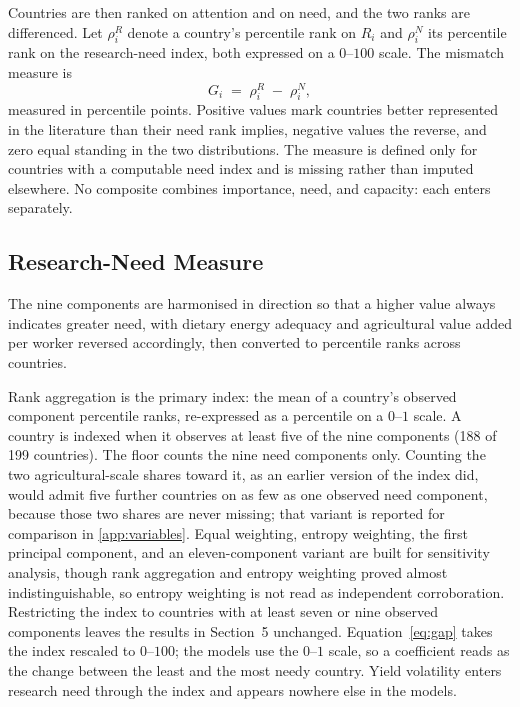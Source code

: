 \documentclass[ASNA,twocolumn]{USG}
\begin{document}
Countries are then ranked on attention and on need, and the two ranks are differenced. Let
$\rho^{R}_{i}$ denote a country's percentile rank on $R_{i}$ and $\rho^{N}_{i}$ its percentile
rank on the research-need index, both expressed on a $0$--$100$ scale. The mismatch measure is
\begin{equation}
G_{i} \;=\; \rho^{R}_{i} \;-\; \rho^{N}_{i},
\label{eq:gap}
\end{equation}
measured in percentile points. Positive values mark countries better represented in the
literature than their need rank implies, negative values the reverse, and zero equal standing
in the two distributions. The measure is defined only for countries with a computable need index and is missing rather than imputed
elsewhere. No composite combines importance, need, and capacity: each enters separately.

\subsection{Research-Need Measure}

The nine components are harmonised in direction so that a higher value always indicates
greater need, with dietary energy adequacy and agricultural value added per worker reversed
accordingly, then converted to percentile ranks across countries.

Rank aggregation is the primary index: the mean of a country's observed component percentile
ranks, re-expressed as a percentile on a $0$--$1$ scale. A country is indexed when it observes at least five of the nine components (188 of 199 countries). The floor counts the
nine need components only. Counting the two agricultural-scale shares toward it, as an earlier
version of the index did, would admit five further countries on as few as one observed need
component, because those two shares are never missing; that variant is reported for comparison
in \ref{app:variables}. Equal weighting, entropy weighting, the first principal component, and
an eleven-component variant are built for sensitivity analysis, though rank aggregation and
entropy weighting proved almost indistinguishable, so entropy weighting is not read as
independent corroboration. Restricting the index to countries with at least seven or nine
observed components leaves the results in Section~5 unchanged. Equation~\eqref{eq:gap} takes the index rescaled to $0$--$100$; the
models use the $0$--$1$ scale, so a coefficient reads as the change between the least and the
most needy country. Yield volatility enters research need through the index and appears
nowhere else in the models.
\end{document}
